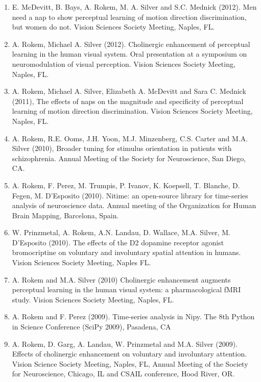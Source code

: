 \documentclass[11pt,fullpage]{article}
\begin{document}
\begin{enumerate}
\item E. McDevitt, B. Bays, A. Rokem, M. A. Silver and S.C. Mednick (2012). Men need a nap to show perceptual learning of motion direction discrimination, but women do not. Vision Sciences Society Meeting, Naples, FL.

\item A. Rokem, Michael A. Silver (2012). Cholinergic enhancement of perceptual learning in the human visual system. Oral presentation at a symposium on neuromodulation of visual perception. Vision Sciences Society Meeting, Naples, FL.

\item A. Rokem, Michael A. Silver, Elizabeth A. McDevitt and Sara C. Mednick (2011), The effects of naps on the magnitude and specificity of perceptual learning of motion direction discrimination. Vision Sciences Society Meeting, Naples, FL.

\item A. Rokem, R.E. Ooms, J.H. Yoon, M.J. Minzenberg, C.S. Carter and M.A. Silver (2010), Broader tuning for stimulus orientation in patients with schizophrenia. Annual Meeting of the Society for Neuroscience, San Diego, CA.

\item A. Rokem, F. Perez, M. Trumpis, P. Ivanov, K. Koepsell, T. Blanche, D. Fegen, M. D'Esposito (2010). Nitime: an open-source library for time-series analysis of neuroscience data. Annual meeting of the Organization for Human Brain Mapping, Barcelona, Spain.

\item W. Prinzmetal, A. Rokem, A.N. Landau, D. Wallace, M.A. Silver, M. D’Esposito (2010). The effects of the D2 dopamine receptor agonist bromocriptine on voluntary and involuntary spatial attention in humans. Vision Sciences Society Meeting, Naples FL.

\item A. Rokem and M.A. Silver (2010) Cholinergic enhancement augments perceptual learning in the human visual system: a pharmacological fMRI study. Vision Sciences Society Meeting, Naples, FL.

\item A. Rokem and F. Perez (2009). Time-series analysis in Nipy. The 8th Python in Science Conference (SciPy 2009), Pasadena, CA

\item A. Rokem, D. Garg, A. Landau, W. Prinzmetal and M.A. Silver (2009). Effects of cholinergic enhancement on voluntary and involuntary attention. Vision Science Society Meeting, Naples, FL, Annual Meeting of the Society for Neuroscience, Chicago, IL and CSAIL conference, Hood River, OR.


\end{enumerate}
\end{document}
